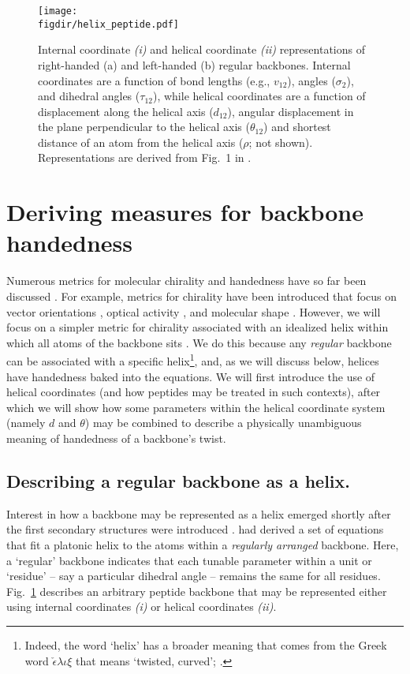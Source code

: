 \documentclass[fleqn,10pt]{wlpeerj} %
\newcommand{\Fig}[1]{Fig.~\ref{#1}}
\newcommand{\figdir}{./figures}
\begin{document}
\begin{figure}[t!]
\mbox{}\hfill
\texttt{[image: \\figdir/helix\_peptide.pdf]}
\hfill\mbox{}\hfill\mbox{}\newline
  \caption{Internal coordinate \textit{(i)} and helical coordinate \textit{(ii)} representations of right-handed (a) and left-handed (b) regular backbones. Internal coordinates are a function of bond lengths (e.g., $v_{12}$), angles ($\sigma_{2}$), and dihedral angles ($\tau_{12}$), while helical coordinates are a function of displacement along the helical axis ($d_{12}$), angular displacement in the plane perpendicular to the helical axis ($\theta_{12}$) and shortest distance of an  atom from the helical axis ($\rho$; not shown). Representations are derived from Fig.~1 in \citep{Shimanouchi1955}.
\label{fig:helix}}
\end{figure}

\section*{Deriving measures for backbone handedness}
Numerous metrics for molecular chirality and handedness have so far been discussed \citep{Harris1999}. For example, metrics for chirality have been introduced that focus on vector orientations \citep{Kwiecinska2005,Gruziel2013}, optical activity \citep{Osipov1995}, and molecular shape \citep{Ferrarini1998}. However, we will focus on a simpler metric for chirality associated with an idealized helix within which all atoms of the backbone sits \citep{Shimanouchi1955,Miyazawa1961,Zacharias2013}. We do this because any {\em regular} backbone can be associated with a specific helix\footnote{Indeed, the word `helix' has a broader meaning that comes from the Greek word $\check\epsilon\lambda\iota\xi$ that means `twisted, curved'; \cite{Liddell1894}.}, and, as we will discuss below, helices have handedness baked into the equations. We will first introduce the use of helical coordinates (and how peptides may be treated in such contexts), after which we will show how some parameters within the helical coordinate system (namely $d$ and $\theta$) may be combined to describe a physically unambiguous meaning of handedness of a backbone's twist.

\subsection*{Describing a regular backbone as a helix.} Interest in how a backbone may be represented as a helix emerged shortly after the first secondary structures were introduced \citep{Pauling1951,Pauling1951a,Pauling1951b}. \cite{Shimanouchi1955} had derived a set of equations that fit a platonic helix to the atoms within a {\it regularly arranged} backbone. Here, a `regular' backbone  indicates that each tunable parameter within a unit or `residue' -- say a particular dihedral angle -- remains the same for all residues. \Fig{fig:helix} describes an arbitrary peptide backbone that may be represented either using internal coordinates \textit{(i)} or helical coordinates \textit{(ii)}. 
\end{document}
